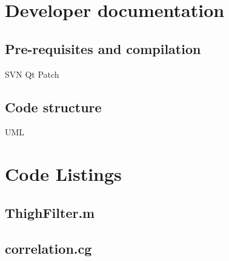 \documentclass[a4paper,12pt]{report}
\begin{document}
\chapter{Developer documentation}

\section{Pre-requisites and compilation}
SVN
Qt Patch
\section{Code structure}
UML

\chapter{Code Listings}

\section{ThighFilter.m}
\lstset{language=Matlab}


\newpage
\section{correlation.cg}
\lstset{language=Cg}

\end{document}
